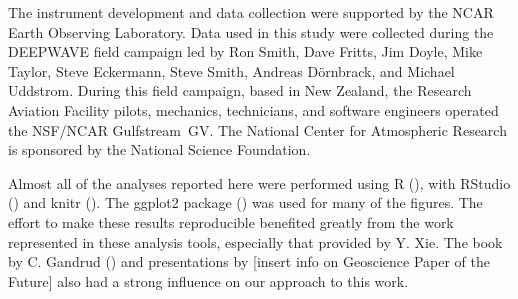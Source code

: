\documentclass[english,british,amt,bookmarks=false,unicode=true]{copernicus}\usepackage[]{graphicx}\usepackage[]{color}
\begin{document}
\begin{acknowledgements}
The instrument development and data collection were supported by the
NCAR Earth Observing Laboratory. Data used in this study were collected
during the DEEPWAVE field campaign led by Ron Smith, Dave Fritts,
Jim Doyle, Mike Taylor, Steve Eckermann, Steve Smith, Andreas D\"ornbrack,
and Michael Uddstrom. During this field campaign, based in New Zealand,
the Research Aviation Facility pilots, mechanics, technicians, and
software engineers operated the NSF/NCAR Gulfstream~GV. The National
Center for Atmospheric Research is sponsored by the National Science
Foundation. 

Almost all of the analyses reported here were performed using R (\citet{Rlanguage}),
with RStudio (\citet{RStudio2012}) and knitr (\citet{Xie2014a,Xie2014b}).
The \textquotedbl{}ggplot2\textquotedbl{} package (\citet{wickham2009})
was used for many of the figures. The effort to make these results
reproducible benefited greatly from the work represented in these
analysis tools, especially that provided by Y. Xie. The book by C.
Gandrud (\citet{Gandrud2014}) and presentations by {[}insert info
on Geoscience Paper of the Future{]} also had a strong influence on
our approach to this work.
\end{acknowledgements}




\pagebreak{}
\end{document}
